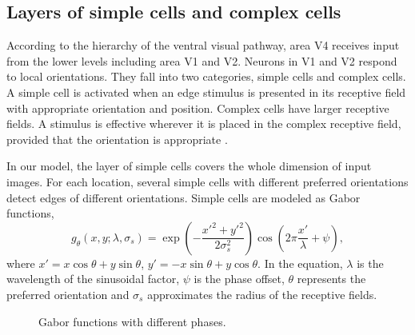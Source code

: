 \documentclass[9pt,twocolumn]{article}
\begin{document}
\subsection{Layers of simple cells and complex cells}

According to the hierarchy of the ventral visual pathway, area V4 receives input from the lower levels including area V1 and V2.
Neurons in V1 and V2 respond to local orientations.
They fall into two categories, simple cells and complex cells.
A simple cell is activated when an edge stimulus is presented in its receptive field with appropriate orientation and position.
Complex cells have larger receptive fields.
A stimulus is effective wherever it is placed in the complex receptive field, provided that the orientation is appropriate \cite{hubel1962}.

In our model, the layer of simple cells covers the whole dimension of input images.
For each location, several simple cells with different preferred orientations detect edges of different orientations.
Simple cells are modeled as Gabor functions,
\begin{equation}\label{equ:gabor}
g_{\theta}(x,y;\lambda,\sigma_s)
=\exp \left(-\frac{x'^2+y'^2}{2\sigma_s^2}\right)
\cos \left(2\pi\frac{x'}{\lambda}+\psi\right),
\end{equation}
where $x'=x\cos\theta+y\sin\theta$, $y'=-x\sin\theta+y\cos\theta$.
In the equation, $\lambda$ is the wavelength of the sinusoidal factor, 
$\psi$ is the phase offset, 
$\theta$ represents the preferred orientation and 
$\sigma_s$ approximates the radius of the receptive fields.

\begin{figure}
\centering
{}
\caption{Gabor functions with different phases.}
\label{fig:4}
\end{figure}
\end{document}
